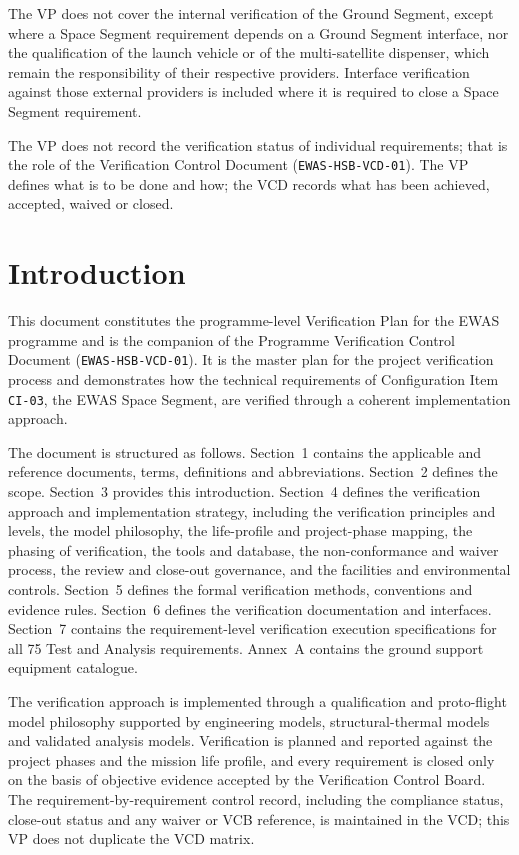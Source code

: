 The VP does not cover the internal verification of the Ground Segment, except where a Space Segment requirement depends on a Ground Segment interface, nor the qualification of the launch vehicle or of the multi-satellite dispenser, which remain the responsibility of their respective providers. Interface verification against those external providers is included where it is required to close a Space Segment requirement.

The VP does not record the verification status of individual requirements; that is the role of the Verification Control Document (\texttt{EWAS-HSB-VCD-01}). The VP defines what is to be done and how; the VCD records what has been achieved, accepted, waived or closed.

\section{Introduction}

This document constitutes the programme-level Verification Plan for the EWAS programme and is the companion of the Programme Verification Control Document (\texttt{EWAS-HSB-VCD-01}). It is the master plan for the project verification process and demonstrates how the technical requirements of Configuration Item \texttt{CI-03}, the EWAS Space Segment, are verified through a coherent implementation approach.

The document is structured as follows. Section~1 contains the applicable and reference documents, terms, definitions and abbreviations. Section~2 defines the scope. Section~3 provides this introduction. Section~4 defines the verification approach and implementation strategy, including the verification principles and levels, the model philosophy, the life-profile and project-phase mapping, the phasing of verification, the tools and database, the non-conformance and waiver process, the review and close-out governance, and the facilities and environmental controls. Section~5 defines the formal verification methods, conventions and evidence rules. Section~6 defines the verification documentation and interfaces. Section~7 contains the requirement-level verification execution specifications for all 75 Test and Analysis requirements. Annex~A contains the ground support equipment catalogue.

The verification approach is implemented through a qualification and proto-flight model philosophy supported by engineering models, structural-thermal models and validated analysis models. Verification is planned and reported against the project phases and the mission life profile, and every requirement is closed only on the basis of objective evidence accepted by the Verification Control Board. The requirement-by-requirement control record, including the compliance status, close-out status and any waiver or VCB reference, is maintained in the VCD; this VP does not duplicate the VCD matrix.

